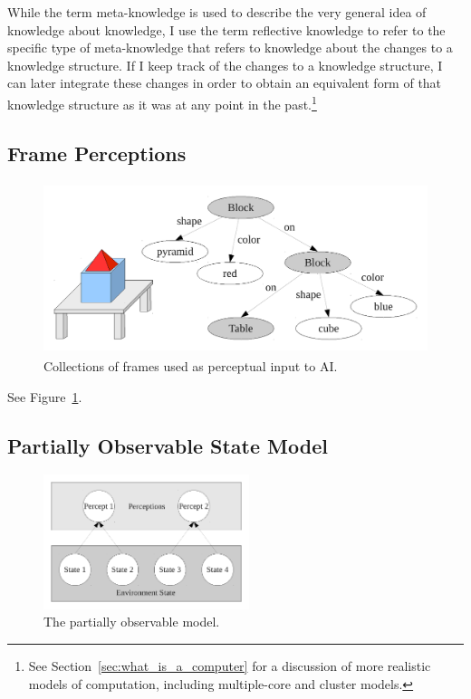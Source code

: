 While the term meta-knowledge is used to describe the very general
idea of knowledge about knowledge, I use the term reflective knowledge
to refer to the specific type of meta-knowledge that refers to
knowledge about the changes to a knowledge structure.  If I keep track
of the changes to a knowledge structure, I can later integrate these
changes in order to obtain an equivalent form of that knowledge
structure as it was at any point in the past.\footnote{See
  Section~\ref{sec:what_is_a_computer} for a discussion of more
  realistic models of computation, including multiple-core and cluster
  models.}


\subsection{Frame Perceptions}

\begin{figure}[bth]
  \center
  \includegraphics[height=5cm]{gfx/frame_perception}
  \caption[Collections of frames used as perceptual input to AI]{Collections of frames used as perceptual input to AI.}
  \label{fig:frame_perception}
\end{figure}

See Figure~\ref{fig:frame_perception}.


\subsection{Partially Observable State Model}

\begin{figure}[bth]
  \center
  \includegraphics[width=6cm]{gfx/partially_observable}
  \caption[The partially observable state model]{The partially observable model.}
  \label{fig:partially_observable}
\end{figure}

